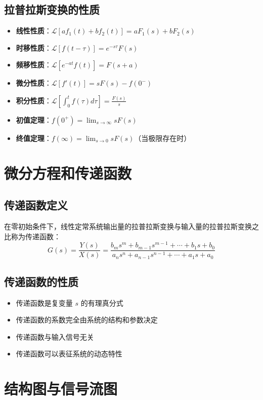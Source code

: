 \documentclass[12pt,a4paper]{article}
\newcommand{\laplace}{\mathcal{L}}
\begin{document}
\subsection{拉普拉斯变换的性质}
\begin{itemize}
    \item \textbf{线性性质}：$\laplace[af_1(t) + bf_2(t)] = aF_1(s) + bF_2(s)$
    \item \textbf{时移性质}：$\laplace[f(t-\tau)] = e^{-s\tau}F(s)$
    \item \textbf{频移性质}：$\laplace[e^{-at}f(t)] = F(s+a)$
    \item \textbf{微分性质}：$\laplace[f'(t)] = sF(s) - f(0^-)$
    \item \textbf{积分性质}：$\laplace[\int_0^t f(\tau)d\tau] = \frac{F(s)}{s}$
    \item \textbf{初值定理}：$f(0^+) = \lim_{s \to \infty} sF(s)$
    \item \textbf{终值定理}：$f(\infty) = \lim_{s \to 0} sF(s)$（当极限存在时）
\end{itemize}

\section{微分方程和传递函数}

\subsection{传递函数定义}
在零初始条件下，线性定常系统输出量的拉普拉斯变换与输入量的拉普拉斯变换之比称为传递函数：
\[G(s) = \frac{Y(s)}{X(s)} = \frac{b_m s^m + b_{m-1}s^{m-1} + \cdots + b_1 s + b_0}{a_n s^n + a_{n-1}s^{n-1} + \cdots + a_1 s + a_0}\]

\subsection{传递函数的性质}
\begin{itemize}
    \item 传递函数是复变量 $s$ 的有理真分式
    \item 传递函数的系数完全由系统的结构和参数决定
    \item 传递函数与输入信号无关
    \item 传递函数可以表征系统的动态特性
\end{itemize}

\section{结构图与信号流图}
\end{document}
